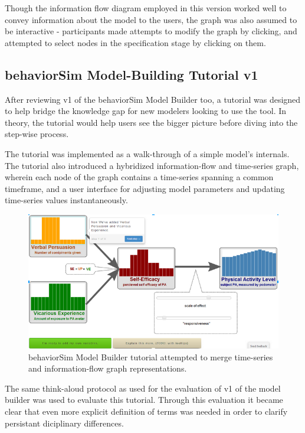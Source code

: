 \documentclass[conference]{IEEEtran}
\begin{document}
Though the information flow diagram employed in this version worked well to convey information about the model to the users, the graph was also assumed to be interactive - participants made attempts to modify the graph by clicking, and attempted to select nodes in the specification stage by clicking on them.


\subsection{behaviorSim Model-Building Tutorial v1}
After reviewing v1 of the behaviorSim Model Builder too, a tutorial was designed to help bridge the knowledge gap for new modelers looking to use the tool.
In theory, the tutorial would help users see the bigger picture before diving into the step-wise process.

The tutorial was implemented as a walk-through of a simple model's internals.
The tutorial also introduced a hybridized information-flow and time-series graph, wherein each node of the graph contains a time-series spanning a common timeframe, and a user interface for adjusting model parameters and updating time-series values instantaneously.
 
\begin{figure}[!t]
  \centering
  \includegraphics[width=0.9\columnwidth]{img/v1-flow}  
  \caption{behaviorSim Model Builder tutorial attempted to merge time-series and information-flow graph representations.}
  \label{model-builder-tutorial}
\end{figure}

The same think-aloud protocol as used for the evaluation of v1 of the model builder was used to evaluate this tutorial. 
Through this evaluation it became clear that even more explicit definition of terms was needed in order to clarify persistant diciplinary differences.

\end{document}
